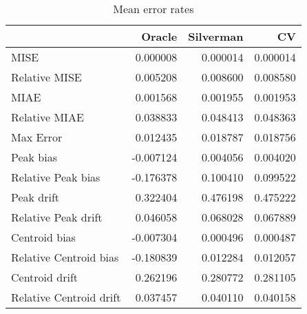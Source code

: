 \begin{table}[H]
\centering
\begin{tabular}{lrrr}
  \hline
 & Oracle & Silverman & CV \\ 
  \hline
MISE & 0.000008 & 0.000014 & 0.000014 \\ 
  Relative MISE & 0.005208 & 0.008600 & 0.008580 \\ 
  MIAE & 0.001568 & 0.001955 & 0.001953 \\ 
  Relative MIAE & 0.038833 & 0.048413 & 0.048363 \\ 
  Max Error & 0.012435 & 0.018787 & 0.018756 \\ 
  Peak bias & -0.007124 & 0.004056 & 0.004020 \\ 
  Relative Peak bias & -0.176378 & 0.100410 & 0.099522 \\ 
  Peak drift & 0.322404 & 0.476198 & 0.475222 \\ 
  Relative Peak drift & 0.046058 & 0.068028 & 0.067889 \\ 
  Centroid bias & -0.007304 & 0.000496 & 0.000487 \\ 
  Relative Centroid bias & -0.180839 & 0.012284 & 0.012057 \\ 
  Centroid drift & 0.262196 & 0.280772 & 0.281105 \\ 
  Relative Centroid drift & 0.037457 & 0.040110 & 0.040158 \\ 
   \hline
\end{tabular}
\caption{Mean error rates} 
\label{tbl:mean_error_rates}
\end{table}
